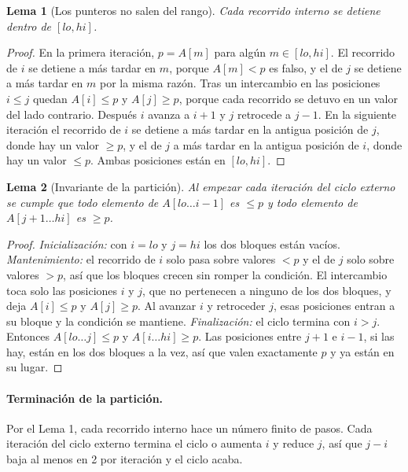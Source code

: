 \documentclass[11pt]{article}
\newtheorem{lema}{Lema}
\begin{document}
\begin{lema}[Los punteros no salen del rango]
Cada recorrido interno se detiene dentro de $[lo, hi]$.
\end{lema}
\begin{proof}
En la primera iteración, $p = A[m]$ para algún $m \in [lo, hi]$. El recorrido de $i$ se detiene a más tardar en $m$, porque $A[m] < p$ es falso, y el de $j$ se detiene a más tardar en $m$ por la misma razón. Tras un intercambio en las posiciones $i \le j$ quedan $A[i] \le p$ y $A[j] \ge p$, porque cada recorrido se detuvo en un valor del lado contrario. Después $i$ avanza a $i+1$ y $j$ retrocede a $j-1$. En la siguiente iteración el recorrido de $i$ se detiene a más tardar en la antigua posición de $j$, donde hay un valor $\ge p$, y el de $j$ a más tardar en la antigua posición de $i$, donde hay un valor $\le p$. Ambas posiciones están en $[lo, hi]$.
\end{proof}

\begin{lema}[Invariante de la partición]
Al empezar cada iteración del ciclo externo se cumple que todo elemento de $A[lo \ldots i-1]$ es $\le p$ y todo elemento de $A[j+1 \ldots hi]$ es $\ge p$.
\end{lema}
\begin{proof}
\emph{Inicialización:} con $i = lo$ y $j = hi$ los dos bloques están vacíos.
\emph{Mantenimiento:} el recorrido de $i$ solo pasa sobre valores $< p$ y el de $j$ solo sobre valores $> p$, así que los bloques crecen sin romper la condición. El intercambio toca solo las posiciones $i$ y $j$, que no pertenecen a ninguno de los dos bloques, y deja $A[i] \le p$ y $A[j] \ge p$. Al avanzar $i$ y retroceder $j$, esas posiciones entran a su bloque y la condición se mantiene.
\emph{Finalización:} el ciclo termina con $i > j$. Entonces $A[lo \ldots j] \le p$ y $A[i \ldots hi] \ge p$. Las posiciones entre $j+1$ e $i-1$, si las hay, están en los dos bloques a la vez, así que valen exactamente $p$ y ya están en su lugar.
\end{proof}

\paragraph{Terminación de la partición.} Por el Lema 1, cada recorrido interno hace un número finito de pasos. Cada iteración del ciclo externo termina el ciclo o aumenta $i$ y reduce $j$, así que $j - i$ baja al menos en 2 por iteración y el ciclo acaba.
\end{document}
